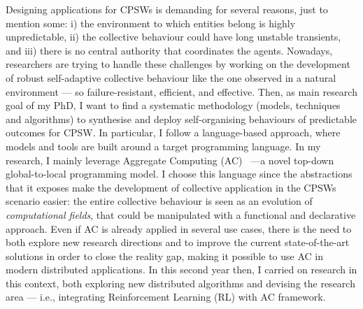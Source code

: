 \documentclass[11pt]{article}
\begin{document}
Designing applications for CPSWs is demanding for several reasons, just to mention some:
 i) the environment to which entities belong is highly unpredictable,
 ii) the collective behaviour could have long unstable transients, and
 iii) there is no central authority that coordinates the agents. 
%
Nowadays, researchers are trying to handle these challenges by working 
 on the development of robust self-adaptive collective behaviour
 like the one observed in a natural environment --- so failure-resistant, efficient, and effective. 
%
Then, as main research goal of my PhD, I want to find a systematic methodology (models, techniques and algorithms) 
 to synthesise and deploy self-organising behaviours of predictable outcomes for CPSW.
%
In particular, I follow a language-based approach, where models and tools are built around
 a target programming language.
%
In my research, 
 I mainly leverage Aggregate Computing (AC)~\cite{beal2015aggregate} ---a novel top-down global-to-local programming model. 
%
I choose this language since the abstractions that it exposes
 make the development of collective application in the CPSWs scenario easier:
 the entire collective behaviour is seen as an evolution of \textit{computational fields},
 that could be manipulated with a functional and declarative approach.
%
Even if AC is already applied in several use cases, 
 there is the need to both explore new research directions and
 to improve the current state-of-the-art solutions in order to close the reality gap, 
 making it possible to use AC in modern distributed applications.
%
In this second year then, 
 I carried on research in this context, 
 both exploring new distributed algorithms and devising the research area 
 --- i.e., integrating Reinforcement Learning (RL) with AC framework. 
\end{document}
